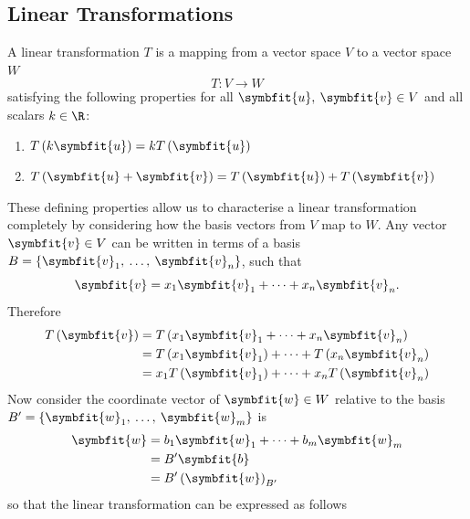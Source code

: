 \documentclass{article}
\begin{document}
\subsection{Linear Transformations}
A linear transformation \(T\) is a mapping from a vector space \(V\) to a vector space \(W\)
\begin{equation*}
    T:V \to W
\end{equation*}
satisfying the following properties for all \(\symbfit{u},\: \symbfit{v} \in V\) and all
scalars \(k \in \R\):
\begin{enumerate}
    \item \(T\left( k\symbfit{u} \right) = k T\left( \symbfit{u} \right)\)
    \item \(T\left( \symbfit{u} + \symbfit{v} \right) = T\left( \symbfit{u} \right) + T\left( \symbfit{v} \right)\)
\end{enumerate}
These defining properties allow us to characterise a linear transformation completely
by considering how the basis vectors from \(V\) map to \(W\). Any vector \(\symbfit{v} \in V\)
can be written in terms of a basis \(B = \left\{ \symbfit{v}_1,\: \dots,\: \symbfit{v}_n \right\}\), such that
\begin{equation*}
    \symbfit{v} = x_1 \symbfit{v}_1 + \cdots + x_n \symbfit{v}_n.
\end{equation*}
Therefore
\begin{align*}
    T\left( \symbfit{v} \right) & = T\left( x_1 \symbfit{v}_1 + \cdots + x_n \symbfit{v}_n \right)                 \\
                                & = T\left( x_1 \symbfit{v}_1 \right) + \cdots + T\left( x_n \symbfit{v}_n \right) \\
                                & = x_1 T\left( \symbfit{v}_1 \right) + \cdots + x_n T\left( \symbfit{v}_n \right)
\end{align*}
Now consider the coordinate vector of \(\symbfit{w} \in W\) relative to the basis \(B' = \left\{ \symbfit{w}_1,\: \dots,\: \symbfit{w}_m \right\}\) is
\begin{align*}
    \symbfit{w} & = b_1 \symbfit{w}_1 + \cdots + b_m \symbfit{w}_m \\
                & = B' \symbfit{b}                                 \\
                & = B' \left( \symbfit{w} \right)_{B'}
\end{align*}
so that the linear transformation can be expressed as follows
\end{document}
